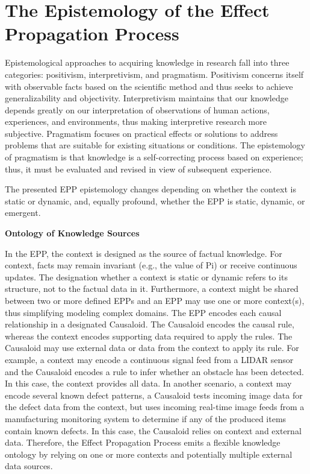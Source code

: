 \section{The Epistemology of the Effect Propagation Process}
\label{sec:epp_epistemology}

Epistemological approaches to acquiring knowledge in research fall into three categories: positivism, interpretivism, and pragmatism. Positivism concerns itself with observable facts based on the scientific method and thus seeks to achieve generalizability and objectivity. Interpretivism maintains that our knowledge depends greatly on our interpretation of observations of human actions, experiences, and environments, thus making interpretive research more subjective. Pragmatism focuses on practical effects or solutions to address problems that are suitable for existing situations or conditions. The epistemology of pragmatism is that knowledge is a self-correcting process based on experience; thus, it must be evaluated and revised in view of subsequent experience.

The presented EPP epistemology changes depending on whether the context is static or dynamic, and, equally profound, whether the EPP is static, dynamic, or emergent.

\textbf{Ontology of Knowledge Sources}

In the EPP, the context is designed as the source of factual knowledge. For context, facts may remain invariant (e.g., the value of Pi) or receive continuous updates. The designation whether a context is static or dynamic refers to its structure, not to the factual data in it. Furthermore, a context might be shared between two or more defined EPPs and an EPP may use one or more context(s), thus simplifying modeling complex domains.
The EPP encodes each causal relationship in a designated Causaloid. The Causaloid encodes the causal rule, whereas the context encodes supporting data required to apply the rules. The Causaloid may use external data or data from the context to apply its rule.
For example, a context may encode a continuous signal feed from a LIDAR sensor and the Causaloid encodes a rule to infer whether an obstacle has been detected. In this case, the context provides all data. In another scenario, a context may encode several known defect patterns, a Causaloid tests incoming image data for the defect data from the context, but uses incoming real-time image feeds from a manufacturing monitoring system to determine if any of the produced items contain known defects. In this case, the Causaloid relies on context and external data. Therefore, the Effect Propagation Process emits a flexible knowledge ontology by relying on one or more contexts and potentially multiple external data sources.

